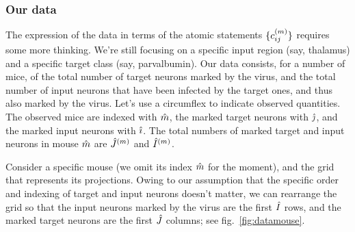 \documentclass[\ifafour a4paper,12pt,\else a5paper,10pt,\fi%
onecolumn,oneside,article,%
british%
]{memoir}
\theoremstyle{remark}
\theoremstyle{innote}
\renewcommand*{\|}[1][]{\nonscript\,#1\vert\nonscript\;\mathopen{}}
\newcommand*{\fig}{fig.}%
\newcommand*{\ycm}[1][m]{c^{(#1)}}
\DeclarePairedDelimiter\tu{\{}{\}}
\newcommand*{\ymh}{\Hat{m}}
\newcommand*{\yih}{\Hat{\imath}}
\newcommand*{\yjh}{\Hat{\jmath}}
\newcommand*{\yIhm}[1][m]{\Hat{I}^{(#1)}}
\newcommand*{\yJhm}[1][m]{\Hat{J}^{(#1)}}
\newcommand*{\yIh}{\Hat{I}}
\newcommand*{\yJh}{\Hat{J}}
\begin{document}
\subsubsection{Our data}
\label{sec:atomic_data}


The expression of the data in terms of the atomic statements
$\tu{\ycm_{ij}}$ requires some more thinking. We're still focusing on a
specific input region (say, thalamus) and a specific target class (say,
parvalbumin). Our data consists, for a number of mice, of the total number
of target neurons marked by the virus, and the total number of input
neurons that have been infected by the target ones, and thus also marked by
the virus. Let's use a circumflex to indicate observed quantities. The
observed mice are indexed with $\ymh$, the marked target neurons with
$\yjh$, and the marked input neurons with $\yih$. The total numbers of
marked target and input neurons in mouse $\ymh$ are $\yJhm$ and $\yIhm$.

Consider a specific mouse (we omit its index $\ymh$ for the moment), and
the grid that represents its projections. Owing to our assumption that the
specific order and indexing of target and input neurons doesn't matter, we
can rearrange the grid so that the input neurons marked by the virus are
the first $\yIh$ rows, and the marked target neurons are the first $\yJh$
columns; see \fig~\ref{fig:datamouse}.
\end{document}
